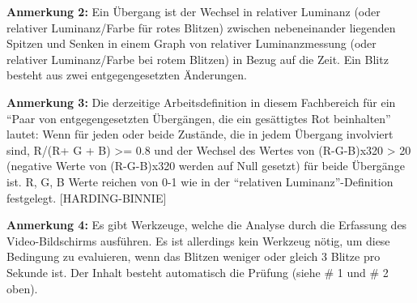 \textbf{Anmerkung 2:} Ein Übergang ist der Wechsel in relativer Luminanz (oder relativer Luminanz/Farbe für rotes Blitzen) zwischen nebeneinander liegenden Spitzen und Senken in einem Graph von relativer Luminanzmessung (oder relativer Luminanz/Farbe bei rotem Blitzen) in Bezug auf die Zeit. Ein Blitz besteht aus zwei entgegengesetzten Änderungen.

\textbf{Anmerkung 3:} Die derzeitige Arbeitsdefinition in diesem Fachbereich für ein "`Paar von entgegengesetzten Übergängen, die ein gesättigtes Rot beinhalten"' lautet: Wenn für jeden oder beide Zustände, die in jedem Übergang involviert sind, R/(R+ G + B) >= 0.8 und der Wechsel des Wertes von (R-G-B)x320 > 20 (negative Werte von (R-G-B)x320 werden auf Null gesetzt) für beide Übergänge ist. R, G, B Werte reichen von 0-1 wie in der "`relativen Luminanz"'-Definition festgelegt. [HARDING-BINNIE]

\textbf{Anmerkung 4:} Es gibt Werkzeuge, welche die Analyse durch die Erfassung des Video-Bildschirms ausführen. Es ist allerdings kein Werkzeug nötig, um diese Bedingung zu evaluieren, wenn das Blitzen weniger oder gleich 3 Blitze pro Sekunde ist. Der Inhalt besteht automatisch die Prüfung (siehe \# 1 und \# 2 oben).

\appendix
